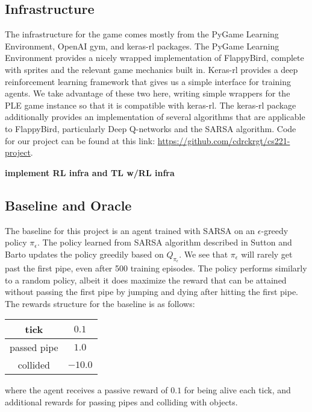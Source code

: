 \documentclass{article}
\begin{document}
\subsection{Infrastructure}

The infrastructure for the game comes mostly from the PyGame Learning Environment, OpenAI gym, and keras-rl packages. 
The PyGame Learning Environment provides a nicely wrapped implementation of FlappyBird, complete with sprites and the relevant game mechanics built in. \cite{ple}
Keras-rl provides a deep reinforcement learning framework that gives us a simple interface for training agents. 
We take advantage of these two here, writing simple wrappers for the PLE game instance so that it is compatible with keras-rl. \cite{kerasrl}
The keras-rl package additionally provides an implementation of several algorithms that are applicable to FlappyBird, particularly Deep Q-networks and the SARSA algorithm.
Code for our project can be found at this link: \href{https://github.com/cdrckrgt/cs221-project} {https://github.com/cdrckrgt/cs221-project}.

\textbf{implement RL infra and TL w/RL infra}

\subsection{Baseline and Oracle}
The baseline for this project is an agent trained with SARSA on an $\epsilon$-greedy policy $\pi_{\epsilon}$.
The policy learned from SARSA algorithm described in Sutton and Barto updates the policy greedily based on $Q_{\pi_{\epsilon}}$. \cite{rl}
We see that $\pi_{\epsilon}$ will rarely get past the first pipe, even after 500 training episodes.
The policy performs similarly to a random policy, albeit it does maximize the reward that can be attained without passing the first pipe by jumping and dying after hitting the first pipe.
The rewards structure for the baseline is as follows:
\begin{center}
\begin{tabular} { | c | c | }
    \hline
    tick & $0.1$ \\
    \hline
    passed pipe & $1.0$ \\
    \hline
    collided & $-10.0$ \\
    \hline
\end{tabular}
\end{center}
where the agent receives a passive reward of $0.1$ for being alive each tick, and additional rewards for passing pipes and colliding with objects.
\end{document}
